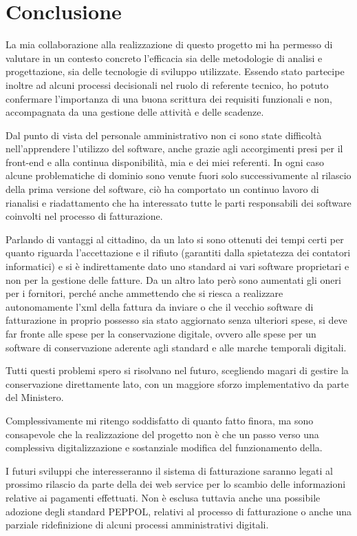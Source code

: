 \chapter*{Conclusione}

La mia collaborazione alla realizzazione di questo progetto mi ha permesso di valutare in un contesto concreto l'efficacia sia delle metodologie di analisi e progettazione, sia delle tecnologie di sviluppo utilizzate.
Essendo stato partecipe inoltre ad alcuni processi decisionali nel ruolo di referente tecnico, ho potuto confermare l'importanza di una buona scrittura dei requisiti funzionali e non, accompagnata da una gestione delle attività e delle scadenze.

Dal punto di vista del personale amministrativo non ci sono state difficoltà nell'apprendere l'utilizzo del software, anche grazie agli accorgimenti presi per il front-end e alla continua disponibilità, mia e dei miei referenti.
In ogni caso alcune problematiche di dominio sono venute fuori solo successivamente al rilascio della prima versione del software, ciò ha comportato un continuo lavoro di rianalisi e riadattamento che ha interessato tutte le parti responsabili dei software coinvolti nel processo di fatturazione.

Parlando di vantaggi al cittadino, da un lato si sono ottenuti dei tempi certi per quanto riguarda l'accettazione e il rifiuto (garantiti dalla spietatezza dei contatori informatici) e si è indirettamente dato uno standard ai vari software proprietari e non per la gestione delle fatture.
Da un altro lato però sono aumentati gli oneri per i fornitori, perché anche ammettendo che si riesca a realizzare autonomamente l'xml della fattura da inviare o che il vecchio software di fatturazione in proprio possesso sia stato aggiornato senza ulteriori spese, si deve far fronte alle spese per la conservazione digitale, ovvero alle spese per un software di conservazione aderente agli standard e alle marche temporali digitali.

Tutti questi problemi spero si risolvano nel futuro, scegliendo magari di gestire la conservazione direttamente lato, con un maggiore sforzo implementativo da parte del Ministero.

Complessivamente mi ritengo soddisfatto di quanto fatto finora, ma sono consapevole che la realizzazione del progetto non è che un passo verso una complessiva digitalizzazione e sostanziale modifica del funzionamento della.

I futuri sviluppi che interesseranno il sistema di fatturazione saranno legati al prossimo rilascio da parte della dei web service per lo scambio delle informazioni relative ai pagamenti effettuati.
Non è esclusa tuttavia anche una possibile adozione degli standard PEPPOL, relativi al processo di fatturazione o anche una parziale ridefinizione di alcuni processi amministrativi digitali.
